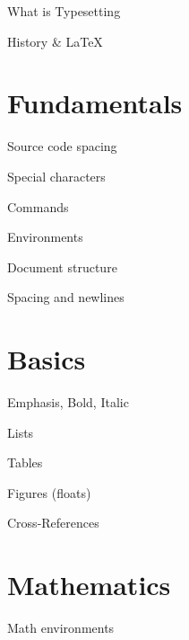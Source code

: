 \documentclass[xetex,serif, onlymath]{beamer}
\begin{document}
\begin{frame}{What is Typesetting}
\end{frame}

\begin{frame}{History \& \textrm{\LaTeX}}
\end{frame}

\section{Fundamentals}
\begin{frame}{Source code spacing}
\end{frame}

\begin{frame}{Special characters}
\end{frame}

\begin{frame}{Commands}
\end{frame}

\begin{frame}{Environments}
\end{frame}

\begin{frame}{Document structure}
\end{frame}

\begin{frame}{Spacing and newlines}
\end{frame}

\section{Basics}
\begin{frame}{Emphasis, Bold, Italic}
\end{frame}

\begin{frame}{Lists}
\end{frame}

\begin{frame}{Tables}
\end{frame}

\begin{frame}{Figures (floats)}
\end{frame}

\begin{frame}{Cross-References}
\end{frame}

\section{Mathematics}
\begin{frame}{Math environments}
\end{frame}
\end{document}
